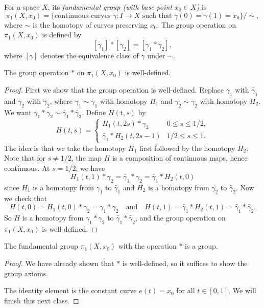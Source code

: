 \begin{definition}
  For a space $X$, its \emph{fundamental group (with base point $x_0 \in X$)}
  is
  \[
    \pi_1(X, x_0)
    = \{\text{continuous curves $\gamma : I \to X$ such that $\gamma(0) = \gamma(1) = x_0$}\} / {\sim},
  \]
  where $\sim$ is the homotopy of curves preserving $x_0$. The
  group operation on $\pi_1(X, x_0)$ is defined by
  \[
    [\gamma_1] * [\gamma_2] = [\gamma_1 * \gamma_2],
  \]
  where $[\gamma]$ denotes the equivalence class of
  $\gamma$ under $\sim$.
\end{definition}

\begin{prop}
  The group operation $*$ on $\pi_1(X, x_0)$ is well-defined.
\end{prop}

\begin{proof}
  First we show that the group operation is well-defined.
  Replace $\gamma_1$ with $\widetilde{\gamma_1}$
  and $\gamma_2$ with $\widetilde{\gamma_2}$, where
  $\gamma_1 \sim \widetilde{\gamma_1}$ with
  homotopy $H_1$ and
  $\gamma_2 \sim \widetilde{\gamma_2}$ with homotopy
  $H_2$. We want
  $\gamma_1 * \gamma_2 \sim \widetilde{\gamma_1} * \widetilde{\gamma_2}$.
  Define $H(t, s)$ by
  \[
    H(t, s) =
    \begin{cases}
      H_1(t, 2s) * \gamma_2 & 0 \le s \le 1/2, \\
      \widetilde{\gamma_1} * H_2(t, 2s - 1) & 1/2 \le s \le 1.
    \end{cases}
  \]
  The idea is that we take the homotopy $H_1$ first
  followed by the homotopy $H_2$. Note that
  for $s \ne 1 / 2$, the map $H$ is a composition
  of continuous maps, hence continuous. At
  $s = 1 / 2$, we have
  \[
    H_1(t, 1) * \gamma_2 =
    \widetilde{\gamma_1} * \gamma_2
    = \widetilde{\gamma_1} * H_2(t, 0)
  \]
  since $H_1$ is a homotopy from $\gamma_1$ to
  $\widetilde{\gamma_1}$ and $H_2$ is a homotopy
  from $\gamma_2$ to $\widetilde{\gamma_2}$.
  Now we check that
  \[
    H(t, 0) = H_1(t, 0) * \gamma_2
    = \gamma_1 * \gamma_2 \quad \text{and} \quad
    H(t, 1) = \widetilde{\gamma_1} * H_2(t, 1)
    = \widetilde{\gamma_1} * \widetilde{\gamma_2}.
  \]
  So $H$ is a homotopy from $\gamma_1 * \gamma_2$
  to $\widetilde{\gamma_1} * \widetilde{\gamma_2}$,
  and the group operation on
  $\pi_1(X, x_0)$ is well-defined.
\end{proof}

\begin{theorem}
  The fundamental group $\pi_1(X, x_0)$ with the
  operation $*$ is a group.
\end{theorem}

\begin{proof}
  We have already shown that $*$ is well-defined,
  so it suffices to show the group axioms.

  The identity element is the constant
  curve $e(t) = x_0$ for all $t \in [0, 1]$. We
  will finish this next class.
\end{proof}
